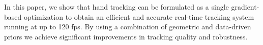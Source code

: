  In this paper, we show that hand tracking can be formulated as a single gradient-based optimization to obtain an efficient and accurate real-time tracking system running at up to 120 fps. By using a combination of geometric and data-driven priors we achieve significant improvements in tracking quality and robustness.
